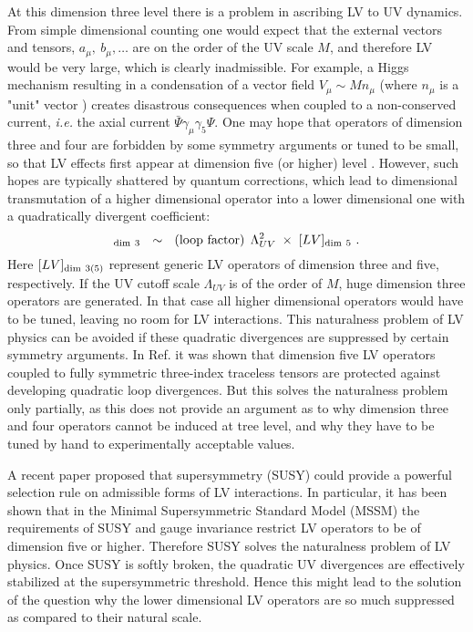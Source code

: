 \documentclass[12pt]{revtex4}
\begin{document}
At this dimension three level there is a problem in ascribing LV to UV
dynamics. From simple dimensional counting  one would expect that the
external vectors and tensors, $a_\mu,~b_\mu,\ldots$ are on the order
of the UV scale $M$, and therefore LV would be very large, which is clearly
inadmissible. For example, a Higgs mechanism resulting in a
condensation of a vector field $V_{\mu}\sim M n_\mu$ (where $n_\mu$ is a 
"unit" vector \cite{Kostelecky:1989jw}) creates disastrous
consequences when coupled to a non-conserved current, 
{\em i.e.} the axial current $\bar \Psi \gamma_\mu\gamma_5 \Psi$.  
One may hope that operators of dimension three and four are forbidden by 
some symmetry arguments or tuned to be small, so that LV effects 
first appear at dimension five (or higher) level \cite{MP:}. 
However, such hopes are typically shattered by quantum corrections, which
lead to dimensional transmutation of a higher dimensional operator into
a lower dimensional one with a quadratically divergent coefficient: 
%
\begin{equation}
[LV]_{\rm dim~3} ~~\sim~~ ({\rm loop~factor}) \, 
\;\Lambda_{UV}^2\;
\times\; [LV]_{{\rm dim}~5}~. 
\label{transmute}
\end{equation}
%
Here $[LV]_{\rm dim~3(5)}$ represent generic LV operators of dimension
three and five, respectively. If the UV cutoff scale $\Lambda_{UV}$ is
of the order of $M$, huge dimension three operators are generated. In
that case all higher dimensional operators would have to be tuned,
leaving no room for LV interactions. This naturalness problem of LV
physics can be avoided if these quadratic divergences are suppressed
by certain symmetry arguments. In Ref. \cite{MP:} it was shown that
dimension five LV operators coupled to fully symmetric three-index
traceless tensors are protected against developing quadratic loop 
divergences. But this solves the naturalness problem only partially, as
this does not provide an argument as to why dimension three and four
operators cannot be induced at tree level, and why they have to be
tuned by hand to experimentally acceptable values.  


A recent paper \cite{GrootNibbelink:2004za} proposed that
supersymmetry (SUSY) could provide a powerful selection rule on
admissible forms of LV interactions. In particular, it has been shown
that in the Minimal Supersymmetric Standard Model (MSSM) the
requirements of SUSY and gauge invariance restrict LV operators to be
of dimension five or higher. Therefore SUSY solves the naturalness
problem of LV physics. 
Once SUSY is softly broken, the quadratic UV divergences are effectively stabilized at 
the supersymmetric threshold. Hence this might lead to the solution of the question
why the lower dimensional LV operators are so much suppressed as
compared to their natural scale. 
\end{document}

